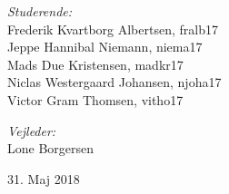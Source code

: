 \documentclass[../main.tex]{subfiles}
\begin{document}
\begin{titlepage}
\begin{center}
\noindent
\begin{minipage}{0.6\textwidth}
\begin{flushleft} 
\small
\emph{Studerende:}\\
    Frederik Kvartborg Albertsen, fralb17\\
    Jeppe Hannibal Niemann, niema17\\
    Mads Due Kristensen, madkr17\\
    Niclas Westergaard Johansen, njoha17\\
    Victor Gram Thomsen, vitho17\\
\end{flushleft}
\end{minipage}%
\begin{minipage}{0.4\textwidth}
\begin{flushright} 
\small
\emph{Vejleder:} \\
Lone Borgersen\\
\end{flushright}
\end{minipage}

\vfill

{\large 31. Maj 2018}
\end{center}
\end{titlepage}
\end{document}
